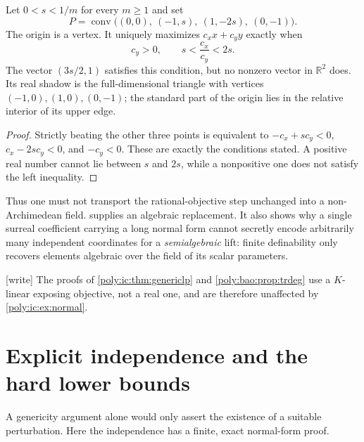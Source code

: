 \documentclass[11pt,a4paper]{article}
\numberwithin{equation}{section}
\theoremstyle{plain}
\newcommand{\wtag}{\textup{[write]}}%
\newcommand{\R}{\mathbb R}
\newcommand{\conv}{\operatorname{conv}}
\begin{document}
\begin{example}\label{poly:ic:ex:normal}
Let $0<s<1/m$ for every $m\geq1$ and set
\[
 P=\conv\bigl((0,0),\ (-1,s),\ (1,-2s),\ (0,-1)\bigr).
\]
The origin is a vertex. It uniquely maximizes $c_xx+c_yy$ exactly when
\[
 c_y>0,\qquad s<\frac{c_x}{c_y}<2s.
\]
The vector $(3s/2,1)$ satisfies this condition, but no nonzero vector
in $\R^2$ does. Its real shadow is the full-dimensional triangle with
vertices $(-1,0),(1,0),(0,-1)$; the standard part of the origin lies in
the relative interior of its upper edge.
\end{example}
\begin{proof}
Strictly beating the other three points is equivalent to
$-c_x+sc_y<0$, $c_x-2sc_y<0$, and $-c_y<0$. These are exactly the
conditions stated. A positive real number cannot lie between $s$ and
$2s$, while a nonpositive one does not satisfy the left inequality.
\end{proof}

Thus one must not transport the rational-objective step unchanged into
a non-Archimedean field.  supplies an algebraic
replacement. It also shows why a single surreal coefficient carrying a
long normal form cannot secretly encode arbitrarily many independent
coordinates for a \emph{semialgebraic} lift: finite definability only
recovers elements algebraic over the field of its scalar parameters.

\wtag{} The proofs of \cref{poly:ic:thm:genericlp} and
\cref{poly:bao:prop:trdeg} use a $K$-linear exposing objective, not a real
one, and are therefore unaffected by \cref{poly:ic:ex:normal}.

\section{Explicit independence and the hard lower bounds}\label{poly:ic:sec:independence}

A genericity argument alone would only assert the existence of a suitable
perturbation. Here the independence has a finite, exact normal-form proof.
\end{document}
